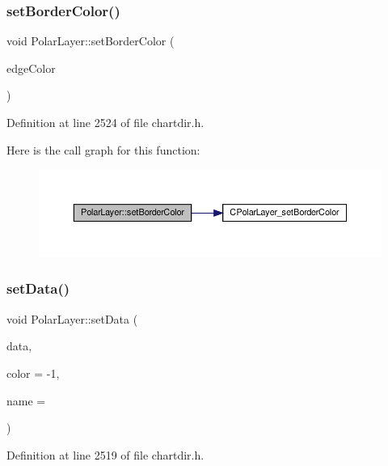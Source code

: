 \subsubsection{\texorpdfstring{set\+Border\+Color()}{setBorderColor()}}
{\footnotesize\ttfamily void Polar\+Layer\+::set\+Border\+Color (\begin{DoxyParamCaption}\item[{int}]{edge\+Color }\end{DoxyParamCaption})\hspace{0.3cm}{\ttfamily [inline]}}



Definition at line 2524 of file chartdir.\+h.

Here is the call graph for this function\+:
\nopagebreak
\begin{figure}[H]
\begin{center}
\leavevmode
\includegraphics[width=350pt]{class_polar_layer_a4cb8110e5d28368088a1798d6dbc7c6c_cgraph}
\end{center}
\end{figure}
\mbox{\label{class_polar_layer_a0a1aa3f4b5c9545790e46be367104dcc}} 
\subsubsection{\texorpdfstring{set\+Data()}{setData()}}
{\footnotesize\ttfamily void Polar\+Layer\+::set\+Data (\begin{DoxyParamCaption}\item[{\hyperlink{class_double_array}{Double\+Array}}]{data,  }\item[{int}]{color = {\ttfamily -\/1},  }\item[{const char $\ast$}]{name = {} }\end{DoxyParamCaption})\hspace{0.3cm}{\ttfamily [inline]}}



Definition at line 2519 of file chartdir.\+h.

